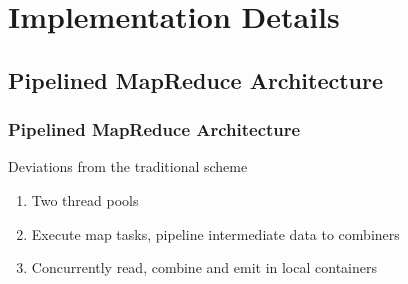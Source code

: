 \section{Implementation Details}



\subsection{Pipelined MapReduce Architecture}
%		

\begin{frame}
	\frametitle{Pipelined MapReduce Architecture}
		\vspace{-10pt}
		\begin{figure}[h]
			\label{fig:pipelined-mr-arch}
		\end{figure}
		
		\vspace{-7pt}
		\begin{block}{Deviations from the traditional scheme}
			\begin{enumerate}
				\item Two thread pools
				\item Execute map tasks, pipeline intermediate data to combiners
				\item Concurrently read, combine and emit in local containers
			\end{enumerate}
		\end{block}
\end{frame}

